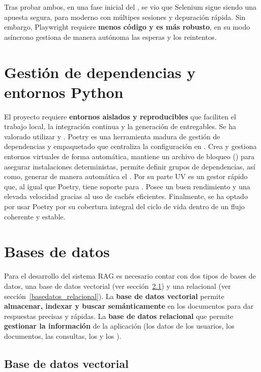 Tras probar ambos, en una fase inicial del , se vio que Selenium sigue siendo una apuesta segura, para  moderno con múltipes sesiones y depuración rápida. Sin embargo, Playwright requiere \textbf{menos código y es más robusto}, en su modo asíncrono gestiona de manera autónoma las esperas y los reintentos. 

\section{Gestión de dependencias y entornos Python}
El proyecto requiere \textbf{entornos aislados y reproducibles} que faciliten el trabajo local, la integración continua y la generación de entregables. Se ha valorado utilizar  y . Poetry es una herramienta madura de gestión de dependencias y empaquetado que centraliza la configuración en . Crea y gestiona entornos virtuales de forma automática, mantiene un archivo de bloqueo () para asegurar instalaciones deterministas, permite definir grupos de dependencias, así como, generar de manera automática el . Por su parte UV es un gestor rápido que, al igual que Poetry, tiene soporte para . Posee un buen rendimiento y una elevada velocidad gracias al uso de cachés eficientes. Finalmente, se ha optado por usar Poetry por su cobertura integral del ciclo de vida dentro de un flujo coherente y estable.

\section{Bases de datos}
Para el desarrollo del sistema RAG es necesario contar con dos tipos de bases de datos, una base de datos vectorial (ver sección~\ref{basedatos_vectorial}{\typeout{\thesubsection}}) y una relacional (ver sección~\ref{basedatos_relacional}). La \textbf{base de datos vectorial} permite \textbf{almacenar, indexar y buscar semánticamente} en los documentos para dar respuestas precisas y rápidas. La \textbf{base de datos relacional} que permite \textbf{gestionar la información} de la aplicación (los datos de los usuarios, los documentos, las consultas, los  y los ).
\subsection{Base de datos vectorial}
\label{basedatos_vectorial}

